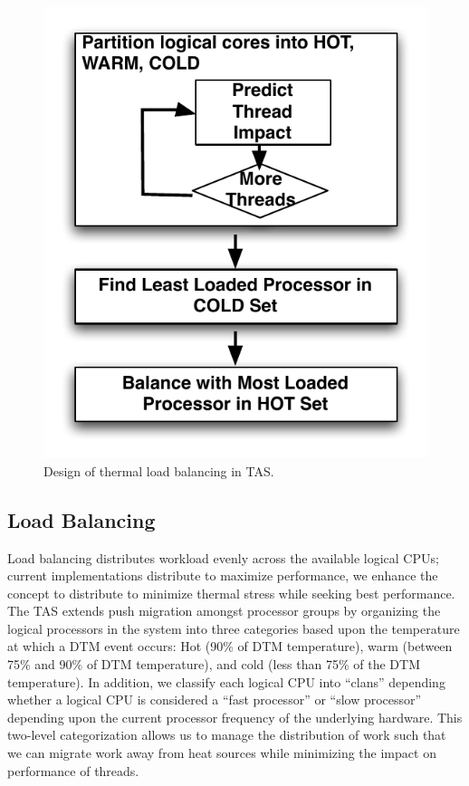 \documentclass[times, 10pt,twocolumn]{IEEEtran}
\begin{document}
\begin{figure}[t] \centering
  \includegraphics[scale=0.7]{tbalance.pdf}
  \caption{Design of thermal load balancing in TAS.}
  \label{fig:thermbal}
\end{figure}
\subsection{Load Balancing}
\label{sec:loadbalance} Load balancing distributes workload evenly
across the available logical CPUs; current implementations distribute to
maximize performance, we enhance the concept to distribute to minimize
thermal stress while seeking best performance. The TAS extends push
migration amongst processor groups by organizing the logical processors
in the system into three categories based upon the temperature at which
a DTM event occurs: Hot (90\% of DTM temperature), warm (between 75\%
and 90\% of DTM temperature), and cold (less than 75\% of the DTM
temperature).  In addition, we classify each logical CPU into ``clans''
depending whether a logical CPU is considered a ``fast processor'' or
``slow processor'' depending upon the current processor frequency of the
underlying hardware.  This two-level categorization allows us to manage
the distribution of work such that we can migrate work away from heat
sources while minimizing the impact on performance of threads.
\end{document}
